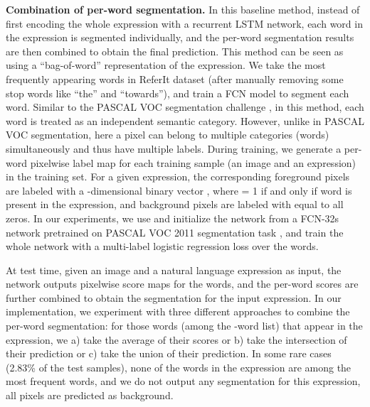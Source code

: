 \documentclass[runningheads]{llncs}
\begin{document}
\textbf{Combination of per-word segmentation.}
In this baseline method, instead of first encoding the whole expression with a recurrent LSTM network, each word in the expression is segmented individually, and the per-word segmentation results are then combined to obtain the final prediction. This method can be seen as using a ``bag-of-word'' representation of the expression. We take the  most frequently appearing words in ReferIt dataset (after manually removing some stop words like ``the'' and ``towards''), and train a FCN model \cite{long2015fully} to segment each word. Similar to the PASCAL VOC segmentation challenge \cite{pascal-voc-2012}, in this method, each word is treated as an independent semantic category. However, unlike in PASCAL VOC segmentation, here a pixel can belong to multiple categories (words) simultaneously and thus have multiple labels. During training, we generate a per-word pixelwise label map for each training sample (an image and an expression) in the training set. For a given expression, the corresponding foreground pixels are labeled with a -dimensional binary vector , where  = 1 if and only if word  is present in the expression, and background pixels are labeled with  equal to all zeros. In our experiments, we use  and initialize the network from a FCN-32s network pretrained on PASCAL VOC 2011 segmentation task \cite{long2015fully}, and train the whole network with a multi-label logistic regression loss over the words.

At test time, given an image and a natural language expression as input, the network outputs pixelwise score maps for the  words, and the per-word scores are further combined to obtain the segmentation for the input expression. In our implementation, we experiment with three different approaches to combine the per-word segmentation: for those words (among the -word list) that appear in the expression, we a) take the average of their scores or b) take the intersection of their prediction or c) take the union of their prediction. In some rare cases (2.83\% of the test samples), none of the words in the expression are among the  most frequent words, and we do not output any segmentation for this expression, \ie all pixels are predicted as background.
\end{document}

